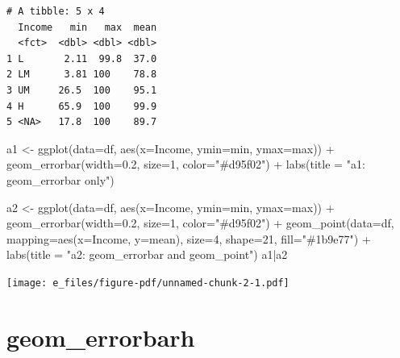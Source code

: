 \documentclass[
  letterpaper,
  DIV=11,
  numbers=noendperiod]{scrreprt}
\newenvironment{Shaded}{\begin{snugshade}}{\end{snugshade}}
\newcommand{\AttributeTok}[1]{\textcolor[rgb]{0.40,0.45,0.13}{#1}}
\newcommand{\DecValTok}[1]{\textcolor[rgb]{0.68,0.00,0.00}{#1}}
\newcommand{\FloatTok}[1]{\textcolor[rgb]{0.68,0.00,0.00}{#1}}
\newcommand{\FunctionTok}[1]{\textcolor[rgb]{0.28,0.35,0.67}{#1}}
\newcommand{\NormalTok}[1]{\textcolor[rgb]{0.00,0.23,0.31}{#1}}
\newcommand{\OtherTok}[1]{\textcolor[rgb]{0.00,0.23,0.31}{#1}}
\newcommand{\SpecialCharTok}[1]{\textcolor[rgb]{0.37,0.37,0.37}{#1}}
\newcommand{\StringTok}[1]{\textcolor[rgb]{0.13,0.47,0.30}{#1}}
\begin{document}
\begin{verbatim}
# A tibble: 5 x 4
  Income   min   max  mean
  <fct>  <dbl> <dbl> <dbl>
1 L       2.11  99.8  37.0
2 LM      3.81 100    78.8
3 UM     26.5  100    95.1
4 H      65.9  100    99.9
5 <NA>   17.8  100    89.7
\end{verbatim}

\begin{Shaded}
\begin{Highlighting}[]
\NormalTok{a1 }\OtherTok{\textless{}{-}} \FunctionTok{ggplot}\NormalTok{(}\AttributeTok{data=}\NormalTok{df, }\FunctionTok{aes}\NormalTok{(}\AttributeTok{x=}\NormalTok{Income, }\AttributeTok{ymin=}\NormalTok{min, }\AttributeTok{ymax=}\NormalTok{max)) }\SpecialCharTok{+} 
\FunctionTok{geom\_errorbar}\NormalTok{(}\AttributeTok{width=}\FloatTok{0.2}\NormalTok{, }\AttributeTok{size=}\DecValTok{1}\NormalTok{, }\AttributeTok{color=}\StringTok{"\#d95f02"}\NormalTok{) }\SpecialCharTok{+} 
  \FunctionTok{labs}\NormalTok{(}\AttributeTok{title =} \StringTok{"a1: geom\_errorbar only"}\NormalTok{)}

\NormalTok{a2 }\OtherTok{\textless{}{-}} \FunctionTok{ggplot}\NormalTok{(}\AttributeTok{data=}\NormalTok{df, }\FunctionTok{aes}\NormalTok{(}\AttributeTok{x=}\NormalTok{Income, }\AttributeTok{ymin=}\NormalTok{min, }\AttributeTok{ymax=}\NormalTok{max)) }\SpecialCharTok{+} 
  \FunctionTok{geom\_errorbar}\NormalTok{(}\AttributeTok{width=}\FloatTok{0.2}\NormalTok{, }\AttributeTok{size=}\DecValTok{1}\NormalTok{, }\AttributeTok{color=}\StringTok{"\#d95f02"}\NormalTok{) }\SpecialCharTok{+} 
  \FunctionTok{geom\_point}\NormalTok{(}\AttributeTok{data=}\NormalTok{df, }\AttributeTok{mapping=}\FunctionTok{aes}\NormalTok{(}\AttributeTok{x=}\NormalTok{Income, }\AttributeTok{y=}\NormalTok{mean), }\AttributeTok{size=}\DecValTok{4}\NormalTok{, }\AttributeTok{shape=}\DecValTok{21}\NormalTok{, }\AttributeTok{fill=}\StringTok{"\#1b9e77"}\NormalTok{) }\SpecialCharTok{+}
  \FunctionTok{labs}\NormalTok{(}\AttributeTok{title =} \StringTok{"a2: geom\_errorbar and geom\_point"}\NormalTok{)}
\NormalTok{a1}\SpecialCharTok{|}\NormalTok{a2}
\end{Highlighting}
\end{Shaded}

\texttt{[image: e\_files/figure-pdf/unnamed-chunk-2-1.pdf]}

\section{geom\_errorbarh}\label{geom_errorbarh}
\end{document}
